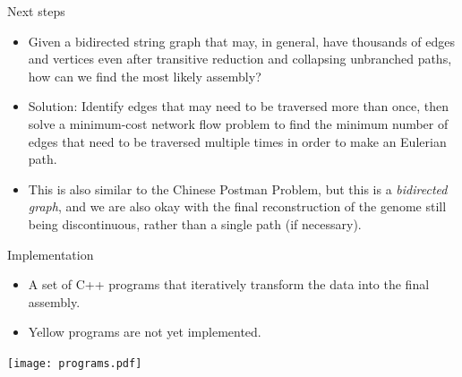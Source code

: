 \documentclass[xcolor=dvipsnames]{beamer}
\begin{document}
\begin{frame}{Next steps}
	\begin{itemize}
		\item Given a bidirected string graph that may, in general, have
		thousands of edges and vertices even after transitive reduction and
		collapsing unbranched paths, how can we find the most likely assembly?
		\item Solution: Identify edges that may need to be traversed more than
		once, then solve a minimum-cost network flow problem to find the minimum
		number of edges that need to be traversed multiple times in order to
		make an Eulerian path.
		\item This is also similar to the Chinese Postman Problem, but this is a
		{\it bidirected graph}, and we are also okay with the final
		reconstruction of the genome still being discontinuous, rather than a
		single path (if necessary).
	\end{itemize}
\end{frame}

\begin{frame}{Implementation}
	\begin{minipage}{0.3\textwidth}
		\begin{itemize}
			\item A set of C++ programs that iteratively transform the data into
			the final assembly.
			\item Yellow programs are not yet implemented.
		\end{itemize}
	\end{minipage}
	\begin{minipage}{0.67\textwidth}
		\texttt{[image: programs.pdf]}
	\end{minipage}
\end{frame}

\end{document}
